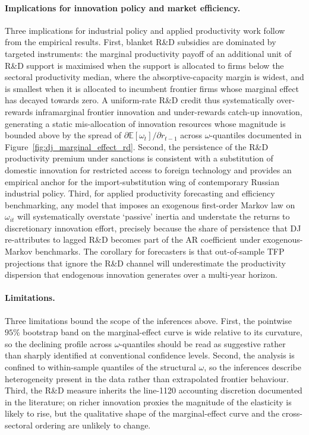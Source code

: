 \documentclass[a4paper, 12pt]{article}
\begin{document}
\paragraph{Implications for innovation policy and market efficiency.} Three implications for industrial policy and applied productivity work follow from the empirical results. First, blanket R\&D subsidies are dominated by targeted instruments: the marginal productivity payoff of an additional unit of R\&D support is maximised when the support is allocated to firms below the sectoral productivity median, where the absorptive-capacity margin is widest, and is smallest when it is allocated to incumbent frontier firms whose marginal effect has decayed towards zero. A uniform-rate R\&D credit thus systematically over-rewards inframarginal frontier innovation and under-rewards catch-up innovation, generating a static mis-allocation of innovation resources whose magnitude is bounded above by the spread of $\partial \mathbb{E}[\omega_t]/\partial r_{t-1}$ across $\omega$-quantiles documented in Figure~\ref{fig:dj_marginal_effect_rd}. Second, the persistence of the R\&D productivity premium under sanctions is consistent with a substitution of domestic innovation for restricted access to foreign technology and provides an empirical anchor for the import-substitution wing of contemporary Russian industrial policy. Third, for applied productivity forecasting and efficiency benchmarking, any model that imposes an exogenous first-order Markov law on $\omega_{it}$ will systematically overstate `passive' inertia and understate the returns to discretionary innovation effort, precisely because the share of persistence that DJ re-attributes to lagged R\&D becomes part of the AR coefficient under exogenous-Markov benchmarks. The corollary for forecasters is that out-of-sample TFP projections that ignore the R\&D channel will underestimate the productivity dispersion that endogenous innovation generates over a multi-year horizon.

\paragraph{Limitations.} Three limitations bound the scope of the inferences above. First, the pointwise $95\%$ bootstrap band on the marginal-effect curve is wide relative to its curvature, so the declining profile across $\omega$-quantiles should be read as suggestive rather than sharply identified at conventional confidence levels. Second, the analysis is confined to within-sample quantiles of the structural $\omega$, so the inferences describe heterogeneity present in the data rather than extrapolated frontier behaviour. Third, the R\&D measure inherits the line-1120 accounting discretion documented in the literature; on richer innovation proxies the magnitude of the elasticity is likely to rise, but the qualitative shape of the marginal-effect curve and the cross-sectoral ordering are unlikely to change.
\end{document}

